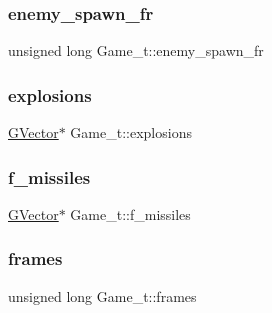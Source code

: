 \hypertarget{struct_game__t_a2208b5a6b7e8ad55bd0f4e09730d9599}{}\label{struct_game__t_a2208b5a6b7e8ad55bd0f4e09730d9599} 
\subsubsection{\texorpdfstring{enemy\+\_\+spawn\+\_\+fr}{enemy\_spawn\_fr}}
{\footnotesize\ttfamily unsigned long Game\+\_\+t\+::enemy\+\_\+spawn\+\_\+fr}

\hypertarget{struct_game__t_a14d975d4e5ce1bf613317321e5d43029}{}\label{struct_game__t_a14d975d4e5ce1bf613317321e5d43029} 
\subsubsection{\texorpdfstring{explosions}{explosions}}
{\footnotesize\ttfamily \hyperlink{group___g_vector_ga6d90d5e6b721779a43354f2752b79281}{G\+Vector}$\ast$ Game\+\_\+t\+::explosions}

\hypertarget{struct_game__t_a9aea8f7d5e9730e64878d220814cf5ee}{}\label{struct_game__t_a9aea8f7d5e9730e64878d220814cf5ee} 
\subsubsection{\texorpdfstring{f\+\_\+missiles}{f\_missiles}}
{\footnotesize\ttfamily \hyperlink{group___g_vector_ga6d90d5e6b721779a43354f2752b79281}{G\+Vector}$\ast$ Game\+\_\+t\+::f\+\_\+missiles}

\hypertarget{struct_game__t_af4d5f8a155f90b1f37e63d35db44734a}{}\label{struct_game__t_af4d5f8a155f90b1f37e63d35db44734a} 
\subsubsection{\texorpdfstring{frames}{frames}}
{\footnotesize\ttfamily unsigned long Game\+\_\+t\+::frames}

\hypertarget{struct_game__t_a172b6aea1411a491f1b6fba4ae7b802b}{}\label{struct_game__t_a172b6aea1411a491f1b6fba4ae7b802b} 
